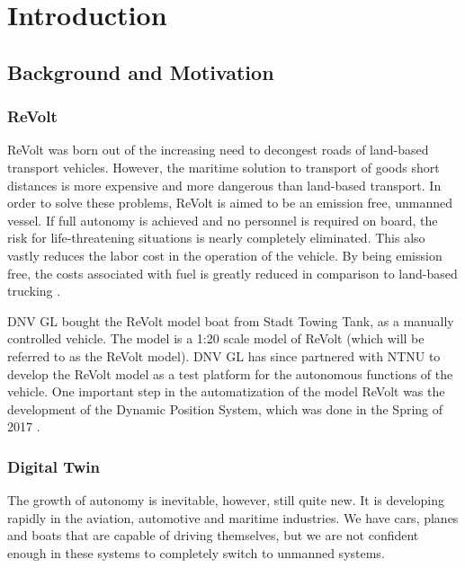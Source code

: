 \chapter{Introduction}

\section{Background and Motivation}

\subsection{ReVolt}
ReVolt was born out of the increasing need to decongest roads of land-based transport vehicles. However, the maritime solution to transport of goods short distances is more expensive and more dangerous than land-based transport. In order to solve these problems, ReVolt is aimed to be an emission free, unmanned vessel. If full autonomy is achieved and no personnel is required on board, the risk for life-threatening situations is nearly completely eliminated. This also vastly reduces the labor cost in the operation of the vehicle. By being emission free, the costs associated with fuel is greatly reduced in comparison to land-based trucking \cite{dnvglRevolt}.

DNV GL bought the ReVolt model boat from Stadt Towing Tank, as a manually controlled vehicle. The model is a 1:20 scale model of ReVolt (which will be referred to as the ReVolt model). DNV GL has since partnered with NTNU to develop the ReVolt model as a test platform for the autonomous functions of the vehicle. One important step in the automatization of the model ReVolt was the development of the Dynamic Position System, which was done in the Spring of 2017 .


\subsection{Digital Twin}
The growth of autonomy is inevitable, however, still quite new. It is developing rapidly in the aviation, automotive and maritime industries. We have cars, planes and boats that are capable of driving themselves, but we are not confident enough in these systems to completely switch to unmanned systems.

